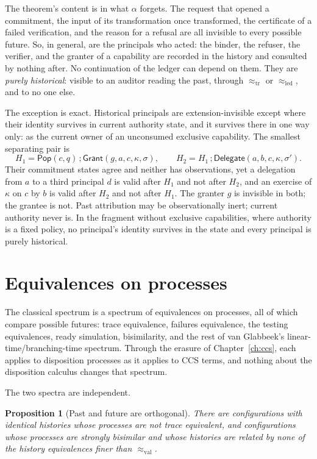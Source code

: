 \documentclass[11pt,openany]{book}
\newtheorem{proposition}[theorem]{Proposition}
\theoremstyle{remark}
\newcommand{\Pop}{\mathsf{Pop}}
\begin{document}
The theorem's content is in what $\alpha$ forgets. The request that
opened a commitment, the input of its transformation once transformed, the
certificate of a failed verification, and the reason for a refusal are all
invisible to every possible future. So, in general, are the principals who
acted: the binder, the refuser, the verifier, and the granter of a
capability are recorded in the history and consulted by nothing after. No
continuation of the ledger can depend on them. They are \emph{purely
historical}: visible to an auditor reading the past, through
$\approx_{\mathrm{tr}}$ or $\approx_{\mathrm{led}}$, and to no one else.

The exception is exact. Historical principals are extension-invisible
except where their identity survives in current authority state, and it
survives there in one way only: as the current owner of an unconsumed
exclusive capability. The smallest separating pair is
\[
H_1=\Pop(c,q)\,;\mathsf{Grant}(g,a,c,\kappa,\sigma),\qquad
H_2=H_1\,;\mathsf{Delegate}(a,b,c,\kappa,\sigma').
\]
Their commitment states agree and neither has observations, yet a
delegation from $a$ to a third principal $d$ is valid after $H_1$ and not
after $H_2$, and an exercise of $\kappa$ on $c$ by $b$ is valid
after $H_2$ and not after $H_1$. The granter $g$ is invisible in both;
the grantee is not. Past attribution may be observationally inert;
current authority never is. In the fragment without exclusive
capabilities, where authority is a fixed policy, no principal's identity
survives in the state and every principal is purely historical.

\section{Equivalences on processes}

The classical spectrum is a spectrum of equivalences on processes, all of
which compare possible futures: trace equivalence, failures equivalence,
the testing equivalences, ready simulation, bisimilarity, and the rest of
van Glabbeek's linear-time/branching-time spectrum. Through the erasure of
Chapter~\ref{ch:ccs}, each applies to disposition processes as it applies
to CCS terms, and nothing about the disposition calculus changes that
spectrum.

The two spectra are independent.

\begin{proposition}[Past and future are orthogonal]\label{prop:orth}
There are configurations with identical histories whose processes are
not trace equivalent, and configurations whose processes are strongly
bisimilar and whose histories are related by none of the history
equivalences finer than $\approx_{\mathrm{val}}$.
\end{proposition}
\end{document}

